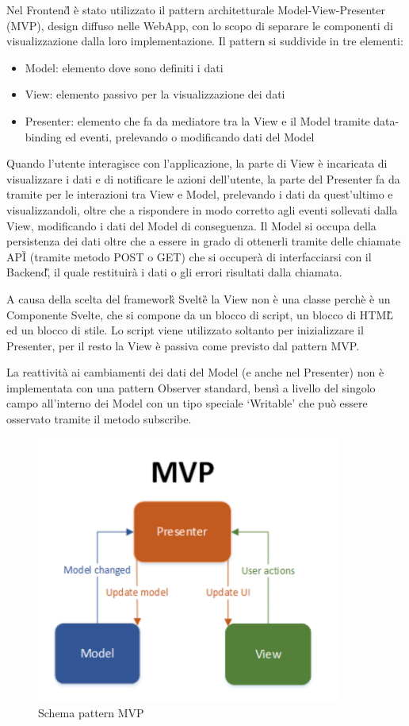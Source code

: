 Nel Frontend\G{} è stato utilizzato il pattern architetturale Model-View-Presenter (MVP), design diffuso nelle WebApp, con lo scopo di separare le componenti di
visualizzazione dalla loro implementazione.
Il pattern si suddivide in tre elementi:
\begin{itemize}
    \item Model: elemento dove sono definiti i dati
    \item View: elemento passivo per la visualizzazione dei dati
    \item Presenter: elemento che fa da mediatore tra la View e il Model tramite data-binding ed eventi, prelevando o modificando dati del Model 
\end{itemize}
Quando l'utente interagisce con l'applicazione, la parte di View è incaricata di visualizzare i dati 
e di notificare le azioni dell'utente, la parte del Presenter fa da tramite per le interazioni tra View e Model, prelevando i dati da quest'ultimo e visualizzandoli, 
oltre che a rispondere in modo corretto agli eventi sollevati dalla View, modificando i dati del Model di conseguenza.
Il Model si occupa della persistenza dei dati oltre che a essere in grado di ottenerli tramite delle chiamate API\G{} (tramite metodo POST o GET) che si occuperà di interfacciarsi con
il Backend\G, il quale restituirà i dati o gli errori risultati dalla chiamata. 

A causa della scelta del framework\G{} Svelte\G{} la View non è una classe perchè è un Componente Svelte, 
che si compone da un blocco di script, un blocco di HTML\G{} ed un blocco di stile.
Lo script viene utilizzato soltanto per inizializzare il Presenter, per il resto la View è passiva come previsto dal pattern MVP. 

La reattività ai cambiamenti dei dati del Model (e anche nel Presenter) non è implementata con una pattern Observer standard,
bensì a livello del singolo campo all'interno dei Model con un tipo speciale `Writable' che può essere osservato tramite il metodo subscribe.

\begin{figure}[!h]
    \includegraphics[width=10cm]{sezioni/images/mvp.png}
    \centering
    \caption{Schema pattern MVP}
\end{figure}

